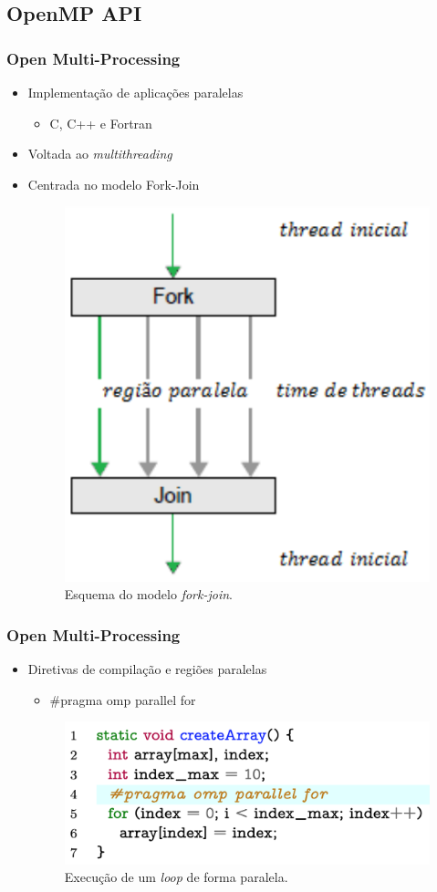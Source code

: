 \documentclass[xcolor={table}]{beamer}
\begin{document}
\subsection{OpenMP API}
\begin{frame}\frametitle{Open Multi-Processing}
    \begin{itemize}
        \item Implementação de aplicações paralelas
        \begin{itemize}
            \item C, C++ e Fortran
        \end{itemize}
        \item Voltada ao \textit{multithreading}
        \item Centrada no modelo Fork-Join
        \begin{figure}[tb]
          \centering
          \includegraphics[width=.4\linewidth, keepaspectratio]{figs/forkjoin.pdf}
          \caption{Esquema do modelo \textit{fork-join}.}
          \label{fig:forkjoin}
        \end{figure}
    \end{itemize}
\end{frame}

\begin{frame}\frametitle{Open Multi-Processing}
    \begin{itemize}
        \item Diretivas de compilação e regiões paralelas
        \begin{itemize}
            \item \#pragma omp parallel for
        \end{itemize}
        \begin{figure}[tb]
          \centering
          \includegraphics[width=.8\linewidth, keepaspectratio]{figs/loopopenmp.png}
          \caption{Execução de um \textit{loop} de forma paralela.}
          \label{lst:parallelloop}
        \end{figure}
    \end{itemize}
\end{frame}
\end{document}
